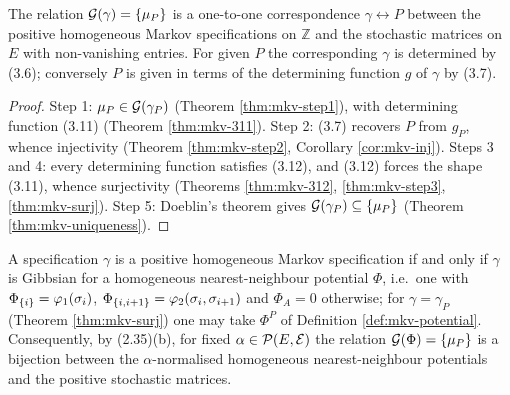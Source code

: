 \begin{theorem}[Georgii (3.5)]
    \label{thm:mkv-35}
    \leanok

    The relation $\mathcal{G}(\gamma) = \left\{ \mu_P \right\}$ is a one-to-one correspondence
    $\gamma \leftrightarrow P$ between the positive homogeneous Markov specifications on
    $\mathbb{Z}$ and the stochastic matrices on $E$ with non-vanishing entries. For given $P$
    the corresponding $\gamma$ is determined by (3.6); conversely $P$ is given in terms of the
    determining function $g$ of $\gamma$ by (3.7).
\end{theorem}
\begin{proof}
    \leanok

    Step 1: $\mu_P \in \mathcal{G}(\gamma_P)$ (Theorem \ref{thm:mkv-step1}), with determining
    function (3.11) (Theorem \ref{thm:mkv-311}). Step 2: (3.7) recovers $P$ from $g_P$, whence
    injectivity (Theorem \ref{thm:mkv-step2}, Corollary \ref{cor:mkv-inj}). Steps 3 and 4:
    every determining function satisfies (3.12), and (3.12) forces the shape (3.11), whence
    surjectivity (Theorems \ref{thm:mkv-312}, \ref{thm:mkv-step3}, \ref{thm:mkv-surj}). Step 5:
    Doeblin's theorem gives $\mathcal{G}(\gamma_P) \subseteq \left\{ \mu_P \right\}$ (Theorem
    \ref{thm:mkv-uniqueness}).
\end{proof}

\begin{corollary}[Georgii (3.9)]
    \label{cor:mkv-39}
    \leanok

    A specification $\gamma$ is a positive homogeneous Markov specification if and only if
    $\gamma$ is Gibbsian for a homogeneous nearest-neighbour potential $\Phi$, i.e.\ one with
    $\Phi_{\left\{ i \right\}} = \varphi_1(\sigma_i)$, $\Phi_{\left\{ i,i+1 \right\}} =
    \varphi_2(\sigma_i,\sigma_{i+1})$ and $\Phi_A = 0$ otherwise; for $\gamma = \gamma_P$
    (Theorem \ref{thm:mkv-surj}) one may take $\Phi^P$ of Definition \ref{def:mkv-potential}.
    Consequently, by (2.35)(b), for fixed $\alpha \in \mathcal{P}(E,\mathcal{E})$ the relation
    $\mathcal{G}(\Phi) = \left\{ \mu_P \right\}$ is a bijection between the $\alpha$-normalised homogeneous
    nearest-neighbour potentials and the positive stochastic matrices.
\end{corollary}

